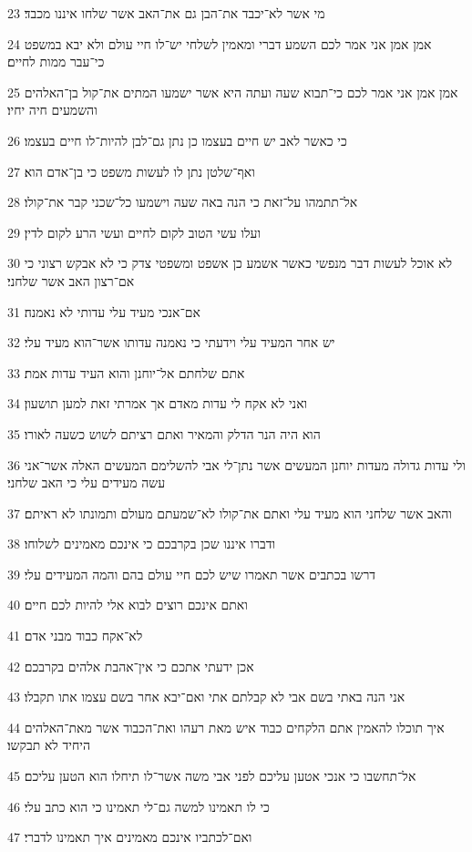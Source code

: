 \par 23 מי אשר לא־יכבד את־הבן גם את־האב אשר שלחו איננו מכבד׃
\par 24 אמן אמן אני אמר לכם השמע דברי ומאמין לשלחי יש־לו חיי עולם ולא יבא במשפט כי־עבר ממות לחיים׃
\par 25 אמן אמן אני אמר לכם כי־תבוא שעה ועתה היא אשר ישמעו המתים את־קול בן־האלהים והשמעים חיה יחיו׃
\par 26 כי כאשר לאב יש חיים בעצמו כן נתן גם־לבן להיות־לו חיים בעצמו׃
\par 27 ואף־שלטן נתן לו לעשות משפט כי בן־אדם הוא׃
\par 28 אל־תתמהו על־זאת כי הנה באה שעה וישמעו כל־שכני קבר את־קולו׃
\par 29 ועלו עשי הטוב לקום לחיים ועשי הרע לקום לדין׃
\par 30 לא אוכל לעשות דבר מנפשי כאשר אשמע כן אשפט ומשפטי צדק כי לא אבקש רצוני כי אם־רצון האב אשר שלחני׃
\par 31 אם־אנכי מעיד עלי עדותי לא נאמנה׃
\par 32 יש אחר המעיד עלי וידעתי כי נאמנה עדותו אשר־הוא מעיד עלי׃
\par 33 אתם שלחתם אל־יוחנן והוא העיד עדות אמת׃
\par 34 ואני לא אקח לי עדות מאדם אך אמרתי זאת למען תושעון׃
\par 35 הוא היה הנר הדלק והמאיר ואתם רציתם לשוש כשעה לאורו׃
\par 36 ולי עדות גדולה מעדות יוחנן המעשים אשר נתן־לי אבי להשלימם המעשים האלה אשר־אני עשה מעידים עלי כי האב שלחני׃
\par 37 והאב אשר שלחני הוא מעיד עלי ואתם את־קולו לא־שמעתם מעולם ותמונתו לא ראיתם׃
\par 38 ודברו איננו שכן בקרבכם כי אינכם מאמינים לשלוחו׃
\par 39 דרשו בכתבים אשר תאמרו שיש לכם חיי עולם בהם והמה המעידים עלי׃
\par 40 ואתם אינכם רוצים לבוא אלי להיות לכם חיים׃
\par 41 לא־אקח כבוד מבני אדם׃
\par 42 אכן ידעתי אתכם כי אין־אהבת אלהים בקרבכם׃
\par 43 אני הנה באתי בשם אבי לא קבלתם אתי ואם־יבא אחר בשם עצמו אתו תקבלו׃
\par 44 איך תוכלו להאמין אתם הלקחים כבוד איש מאת רעהו ואת־הכבוד אשר מאת־האלהים היחיד לא תבקשו׃
\par 45 אל־תחשבו כי אנכי אטען עליכם לפני אבי משה אשר־לו תיחלו הוא הטען עליכם׃
\par 46 כי לו תאמינו למשה גם־לי תאמינו כי הוא כתב עלי׃
\par 47 ואם־לכתביו אינכם מאמינים איך תאמינו לדברי׃

